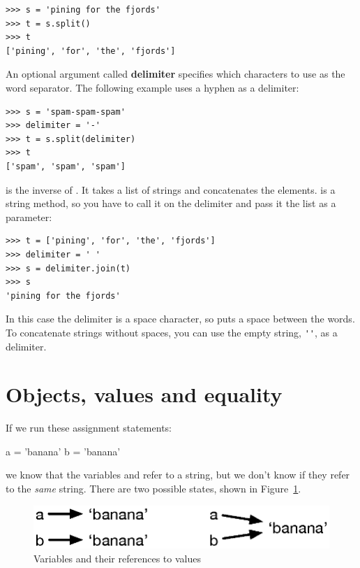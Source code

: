 \begin{Verbatim}[frame=single]
>>> s = 'pining for the fjords'
>>> t = s.split()
>>> t
['pining', 'for', 'the', 'fjords']
\end{Verbatim}
%
An optional argument called \textbf{delimiter} specifies which characters to use as the word separator. The following example uses a hyphen as a delimiter:

\begin{Verbatim}[frame=single]
>>> s = 'spam-spam-spam'
>>> delimiter = '-'
>>> t = s.split(delimiter)
>>> t
['spam', 'spam', 'spam']
\end{Verbatim}
%
 is the inverse of . It takes a list of strings and concatenates the elements.  is a string method, so you have to call it on the delimiter and pass it the list as a parameter:

\begin{Verbatim}[frame=single]
>>> t = ['pining', 'for', 'the', 'fjords']
>>> delimiter = ' '
>>> s = delimiter.join(t)
>>> s
'pining for the fjords'
\end{Verbatim}
%
In this case the delimiter is a space character, so  puts a space between the words. To concatenate strings without spaces, you can use the empty string, \verb"''", as a delimiter.


\section{Objects, values and equality}
\label{equivalence}

If we run these assignment statements:

\begin{python}[frame=single]
a = 'banana'
b = 'banana'
\end{python}
%
we know that the variables  and  refer to a string, but we don't know if they refer to the {\em same} string. There are two possible states, shown in Figure~\ref{fig.list1}.

\begin{figure}
\centerline
{\includegraphics[scale=0.8]{images/list1.eps}}
\caption{Variables and their references to values}
\label{fig.list1}
\end{figure}

